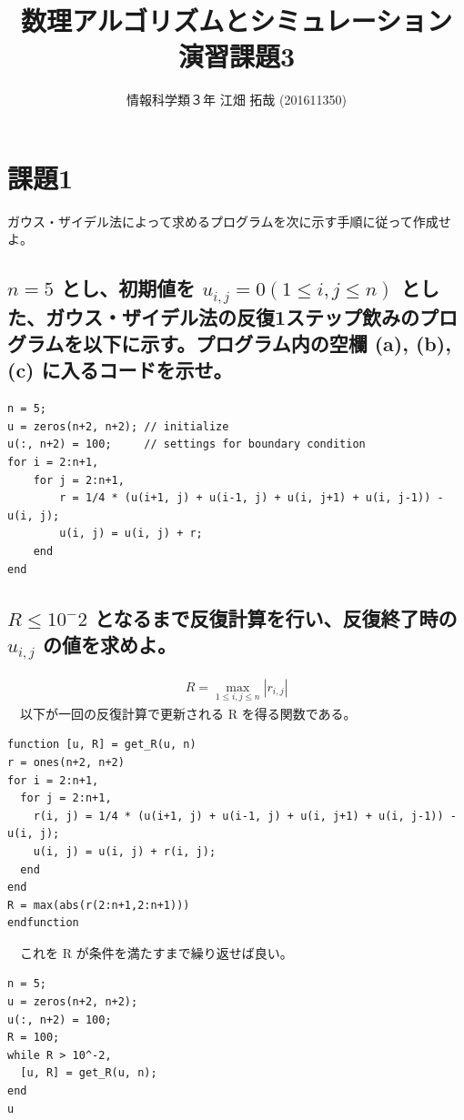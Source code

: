 \documentclass{scrartcl}
\author{情報科学類３年 江畑 拓哉 (201611350)}
\date{}
\title{数理アルゴリズムとシミュレーション\\\medskip
\large 演習課題3}
\begin{document}
\maketitle
\section{課題1}
\label{sec:orgf1d1caa}
ガウス・ザイデル法によって求めるプログラムを次に示す手順に従って作成せよ。\\
\subsection{\(n = 5\) とし、初期値を \(u_{i, j} = 0(1 \leq i, j \leq n)\) とした、ガウス・ザイデル法の反復1ステップ飲みのプログラムを以下に示す。プログラム内の空欄 (a), (b), (c) に入るコードを示せ。}
\label{sec:org8158451}
\begin{verbatim}
n = 5;
u = zeros(n+2, n+2); // initialize
u(:, n+2) = 100;     // settings for boundary condition
for i = 2:n+1,
    for j = 2:n+1,
        r = 1/4 * (u(i+1, j) + u(i-1, j) + u(i, j+1) + u(i, j-1)) - u(i, j);
        u(i, j) = u(i, j) + r;
    end
end
\end{verbatim}
\subsection{\(R\leq 10^-2\) となるまで反復計算を行い、反復終了時の \(u_{i, j}\) の値を求めよ。}
\label{sec:orga8b05f3}
\begin{eqnarray*}
R = \max_{1 \leq i, j \leq n} |r_{i, j}|
\end{eqnarray*}
　以下が一回の反復計算で更新される R を得る関数である。\\
\begin{verbatim}
function [u, R] = get_R(u, n)
r = ones(n+2, n+2)
for i = 2:n+1,
  for j = 2:n+1,
    r(i, j) = 1/4 * (u(i+1, j) + u(i-1, j) + u(i, j+1) + u(i, j-1)) - u(i, j);
    u(i, j) = u(i, j) + r(i, j);
  end
end
R = max(abs(r(2:n+1,2:n+1)))
endfunction
\end{verbatim}
　これを R が条件を満たすまで繰り返せば良い。\\
\begin{verbatim}
n = 5;
u = zeros(n+2, n+2);
u(:, n+2) = 100;
R = 100;
while R > 10^-2,
  [u, R] = get_R(u, n);
end
u
\end{verbatim}
\end{document}
